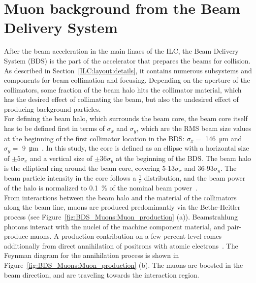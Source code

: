 \section{Muon background from the Beam Delivery System}
\label{BDS_Muons}
After the beam acceleration in the main linacs of the ILC, the Beam Delivery System (BDS) is the part of the accelerator that prepares the beams for collision.
As described in Section~\ref{ILC:layout:details}, it contains numerous subsystems and components for beam collimation and focusing. 
Depending on the aperture of the collimators, some fraction of the beam halo hits the collimator material, which has the desired effect of collimating the beam, but also the undesired effect of producing background particles.
\\For defining the beam halo, which surrounds the beam core, the beam core itself has to be defined first in terms of $\sigma_x$ and $\sigma_y$, which are the RMS beam size values at the beginning of the first collimator location in the BDS: $\sigma_x = $ \SI{146}{\micro\meter} and $\sigma_y = $ \SI{9}{\micro\meter}~\cite{Lewis}.
In this study, the core is defined as an ellipse with a horizontal size of $\pm 5\sigma_x$ and a vertical size of $\pm 36\sigma_y$ at the beginning of the BDS.
The beam halo is the elliptical ring around the beam core, covering 5-13$\sigma_x$ and 36-93$\sigma_y$.
The beam particle intensity in the core follows a $\frac{1}{r}$ distribution, and the beam power of the halo is normalized to \SI{0.1}{\percent} of the nominal beam power~\cite{Glens_muon_talk}.
\\From interactions between the beam halo and the material of the collimators along the beam line, muons are produced predominantly via the Bethe-Heitler process (see Figure~\ref{fig:BDS_Muons:Muon_production} (a)).
Beamstrahlung photons interact with the nuclei of the machine component material, and pair-produce muons.
A production contribution on a few percent level comes additionally from direct annihilation of positrons with atomic electrons~\cite{MuonBkg_1TeV}.
The Feynman diagram for the annihilation process is shown in Figure~\ref{fig:BDS_Muons:Muon_production} (b).
The muons are boosted in the beam direction, and are traveling towards the interaction region.\\

